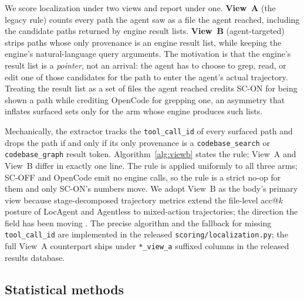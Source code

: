 We score localization under two views and report under one. \textbf{View~A} (the legacy
rule) counts every path the agent saw as a file the agent reached, including the
candidate paths returned by engine result lists. \textbf{View~B} (agent-targeted)
strips paths whose only provenance is an engine result list, while keeping the engine's
natural-language query arguments. The motivation is that the engine's result list is a
\emph{pointer}, not an arrival: the agent has to choose to grep, read, or edit one of
those candidates for the path to enter the agent's actual trajectory. Treating the
result list as a set of files the agent reached credits SC-ON for being shown a path
while crediting OpenCode for grepping one, an asymmetry that inflates surfaced sets only
for the arm whose engine produces such lists.

Mechanically, the extractor tracks the \texttt{tool\_call\_id} of every surfaced path
and drops the path if and only if its only provenance is a \texttt{codebase\_search} or
\texttt{codebase\_graph} result token. Algorithm~\ref{alg:viewb} states the rule;
View~A and View~B differ in exactly one line. The rule is applied uniformly to all three
arms; SC-OFF and OpenCode emit no engine calls, so the rule is a strict no-op for them
and only SC-ON's numbers move. We adopt View~B as the body's primary view because
stage-decomposed trajectory metrics extend the file-level acc@$k$ posture of LocAgent
\citep{locagent2025} and Agentless \citep{agentless2024} to mixed-action trajectories;
the direction the field has been moving \citep{trajeval2026, sweexplore2026}. The
precise algorithm and the fallback for missing \texttt{tool\_call\_id} are implemented
in the released \texttt{scoring/localization.py}; the full View~A counterpart ships
under \texttt{*\_view\_a} suffixed columns in the released results database.

\FloatBarrier
\subsection{Statistical methods}
\label{sec:design-stats}

